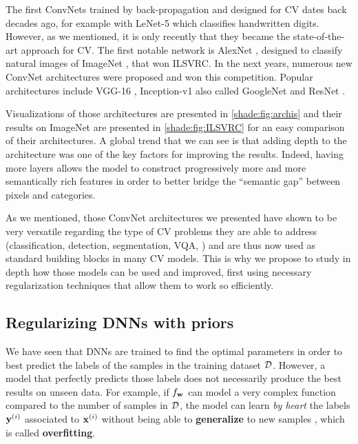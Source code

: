 The first \acp{ConvNet} trained by back-propagation and designed for \ac{CV} dates back decades ago, for example with LeNet-5 \citep{lecun} which classifies handwritten digits. However, as we mentioned, it is only recently that they became the state-of-the-art approach for \ac{CV}. The first notable network is AlexNet \citep{alexnet}, designed to classify natural images of ImageNet \citep{imagenet}, that won \ac{ILSVRC}. In the next years, numerous new \ac{ConvNet} architectures were proposed and won this competition. Popular architectures include VGG-16 \citep{simonyan2015very}, Inception-v1 also called GoogleNet \citep{szegedy2015going} and ResNet \citep{resnet}.

Visualizations of those architectures are presented in \autoref{shade:fig:archis} and their results on ImageNet are presented in \autoref{shade:fig:ILSVRC} for an easy comparison of their architectures. A global trend that we can see is that adding depth to the architecture was one of the key factors for improving the results. Indeed, having more layers allows the model to construct progressively more and more semantically rich features in order to better bridge the ``semantic gap'' between pixels and categories.

As we mentioned, those \ac{ConvNet} architectures we presented have shown to be very versatile regarding the type of \ac{CV} problems they are able to address (classification, detection, segmentation, \acs{VQA}, \etc) and are thus now used as standard building blocks in many \ac{CV} models. This is why we propose to study in depth how those models can be used and improved, first using necessary regularization techniques that allow them to work so efficiently.


\subsection{Regularizing DNNs with priors} \label{shade:sec:RW_regul}

We have seen that \acp{DNN} are trained to find the optimal parameters in order to best predict the labels of the samples in the training dataset $\mathcal{D}$. However, a model that perfectly predicts those labels does not necessarily produce the best results on unseen data. For example, if $f_{\mathbf{w}}$ can model a very complex function compared to the number of samples in $\mathcal{D}$, the model can learn \textit{by heart} the labels $\mathbf{y}^{(i)}$ associated to $\mathbf{x}^{(i)}$ without being able to \textbf{generalize} to new samples \citep{vcdim}, which is called \textbf{overfitting}.

